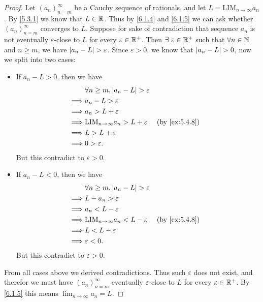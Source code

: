 \begin{proof}
  Let \((a_n)_{n = m}^\infty\) be a Cauchy sequence of rationals, and let \(L = \text{LIM}_{n \to \infty} a_n\).
  By \cref{5.3.1} we know that \(L \in \mathbb{R}\).
  Thus by \cref{6.1.4} and \cref{6.1.5} we can ask whether \((a_n)_{n = m}^\infty\) converges to \(L\).
  Suppose for sake of contradiction that sequence \(a_n\) is not eventually \(\varepsilon\)-close to \(L\) for every \(\varepsilon \in \mathbb{R}^+\).
  Then \(\exists\ \varepsilon \in \mathbb{R}^+\) such that \(\forall n \in \mathbb{N}\) and \(n \geq m\), we have \(\left\lvert a_n - L\right\rvert > \varepsilon\).
  Since \(\varepsilon > 0\), we know that \(\left\lvert a_n - L\right\rvert > 0\), now we split into two cases:
  \begin{itemize}
    \item If \(a_n - L > 0\), then we have
          \begin{align*}
                     & \forall n \geq m, \abs{a_n - L} > \varepsilon                                    \\
            \implies & a_n - L > \varepsilon                                                            \\
            \implies & a_n > L + \varepsilon                                                            \\
            \implies & \text{LIM}_{n \to \infty} a_n > L + \varepsilon &  & \text{(by \cref{ex:5.4.8})} \\
            \implies & L > L + \varepsilon                                                              \\
            \implies & 0 > \varepsilon.
          \end{align*}
          But this contradict to \(\varepsilon > 0\).
    \item If \(a_n - L < 0\), then we have
          \begin{align*}
                     & \forall n \geq m, \abs{a_n - L} > \varepsilon                                    \\
            \implies & L - a_n > \varepsilon                                                            \\
            \implies & a_n < L - \varepsilon                                                            \\
            \implies & \text{LIM}_{n \to \infty} a_n < L - \varepsilon &  & \text{(by \cref{ex:5.4.8})} \\
            \implies & L < L - \varepsilon                                                              \\
            \implies & \varepsilon < 0.
          \end{align*}
          But this contradict to \(\varepsilon > 0\).
  \end{itemize}
  From all cases above we derived contradictions.
  Thus such \(\varepsilon\) does not exist, and therefor we must have \((a_n)_{n = m}^\infty\) eventually \(\varepsilon\)-close to \(L\) for every \(\varepsilon \in \mathbb{R}^+\).
  By \cref{6.1.5} this means \(\lim_{n \to \infty} a_n = L\).
\end{proof}

